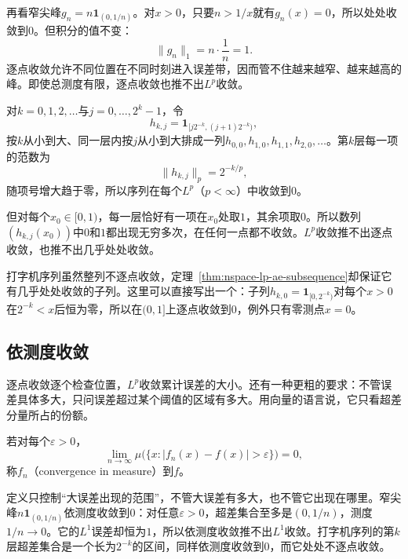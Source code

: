 再看窄尖峰$g_n=n\mathbf 1_{(0,1/n)}$。对$x>0$，只要$n>1/x$就有$g_n(x)=0$，所以处处收敛到$0$。但积分的值不变：
\[
 \lVert g_n\rVert_1=n\cdot\frac1n=1.
\]
逐点收敛允许不同位置在不同时刻进入误差带，因而管不住越来越窄、越来越高的峰。即使总测度有限，逐点收敛也推不出$L^p$收敛。

\begin{example}[打字机序列]
\label{ex:nspace-typewriter}
对$k=0,1,2,\ldots$与$j=0,\ldots,2^k-1$，令
\[
 h_{k,j}=\mathbf 1_{[j2^{-k},(j+1)2^{-k})},
\]
按$k$从小到大、同一层内按$j$从小到大排成一列$h_{0,0},h_{1,0},h_{1,1},h_{2,0},\ldots$。第$k$层每一项的范数为
\[
 \lVert h_{k,j}\rVert_p=2^{-k/p},
\]
随项号增大趋于零，所以序列在每个$L^p$（$p<\infty$）中收敛到$0$。

但对每个$x_0\in[0,1)$，每一层恰好有一项在$x_0$处取$1$，其余项取$0$。所以数列$(h_{k,j}(x_0))$中$0$和$1$都出现无穷多次，在任何一点都不收敛。$L^p$收敛推不出逐点收敛，也推不出几乎处处收敛。
\end{example}

打字机序列虽然整列不逐点收敛，定理~\ref{thm:nspace-lp-ae-subsequence}却保证它有几乎处处收敛的子列。这里可以直接写出一个：子列$h_{k,0}=\mathbf 1_{[0,2^{-k})}$对每个$x>0$在$2^{-k}<x$后恒为零，所以在$(0,1]$上逐点收敛到$0$，例外只有零测点$x=0$。

\subsection{依测度收敛}
\label{sec:nspace-convergence-in-measure}

逐点收敛逐个检查位置，$L^p$收敛累计误差的大小。还有一种更粗的要求：不管误差具体多大，只问误差超过某个阈值的区域有多大。用向量的语言说，它只看超差分量所占的份额。

\begin{definition}[依测度收敛]
\label{def:nspace-convergence-in-measure}
若对每个$\varepsilon>0$，
\begin{equation}
 \lim_{n\to\infty}\mu\bigl(\{x:\lvert f_n(x)-f(x)\rvert>\varepsilon\}\bigr)=0,
 \label{eq:nspace-convergence-in-measure}
\end{equation}
称$f_n$（convergence in measure）到$f$。
\end{definition}

定义只控制“大误差出现的范围”，不管大误差有多大，也不管它出现在哪里。窄尖峰$n\mathbf 1_{(0,1/n)}$依测度收敛到$0$：对任意$\varepsilon>0$，超差集合至多是$(0,1/n)$，测度$1/n\to0$。它的$L^1$误差却恒为$1$，所以依测度收敛推不出$L^1$收敛。打字机序列的第$k$层超差集合是一个长为$2^{-k}$的区间，同样依测度收敛到$0$，而它处处不逐点收敛。

